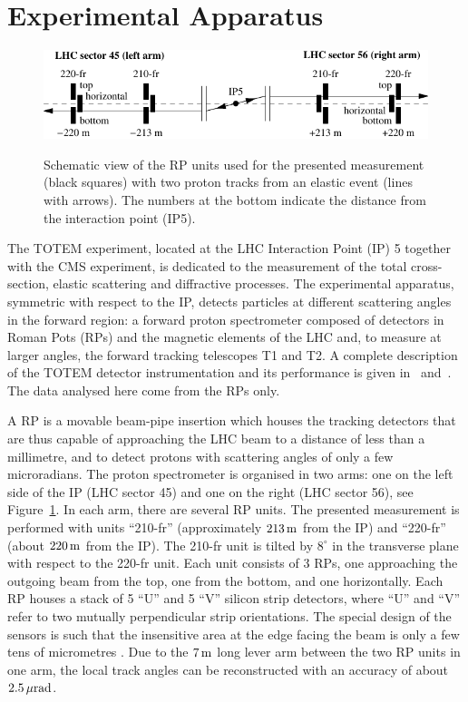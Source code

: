 \section{Experimental Apparatus}
\label{sec:exp apparatus}

\begin{figure}
\begin{center}
\includegraphics{fig/elastic_principle.pdf}
\caption{%
Schematic view of the RP units used for the presented measurement (black squares) with two proton tracks from an elastic event (lines with arrows). The numbers at the bottom indicate the distance from the interaction point (IP5).
}
\vskip-6mm
\label{fig:rpsketch}
\end{center}
\end{figure}

The TOTEM experiment, located at the LHC Interaction Point (IP) 5 together with the CMS experiment, is dedicated to the measurement of the total cross-section, elastic scattering and diffractive processes. The experimental apparatus, symmetric with respect to the IP, detects particles at different scattering angles in the forward region: a forward proton spectrometer composed of detectors in Roman Pots (RPs) and the magnetic elements of the LHC and, to measure at larger angles, the forward tracking telescopes T1 and T2. A complete description of the TOTEM detector instrumentation and its performance is given in~\cite{totem-jinst} and~\cite{totem-ijmp}. The data analysed here come from the RPs only. 

A RP is a movable beam-pipe insertion which houses the tracking detectors that are thus capable of approaching the LHC beam to a distance of less than a millimetre, and to detect protons with scattering angles of only a few microradians. The proton spectrometer is organised in two arms: one on the left side of the IP (LHC sector 45) and one on the right (LHC sector 56), see Figure~\ref{fig:rpsketch}. In each arm, there are several RP units. The presented measurement is performed with units ``210-fr'' (approximately $213\,{\rm m}$ from the IP) and ``220-fr'' (about $220\,{\rm m}$ from the IP). The 210-fr unit is tilted by $8^\circ$ in the transverse plane with respect to the 220-fr unit. Each unit consists of 3 RPs, one approaching the outgoing beam from the top, one from the bottom, and one horizontally. Each RP houses a stack of 5 ``U'' and 5 ``V'' silicon strip detectors, where ``U'' and ``V'' refer to two mutually perpendicular strip orientations. The special design of the sensors is such that the insensitive area at the edge facing the beam is only a few tens of micrometres \cite{edgeless-strips}. Due to the $7\,{\rm m}$ long lever arm between the two RP units in one arm, the local track angles can be reconstructed with an accuracy  of about $2.5\,{\rm \mu rad}$.

